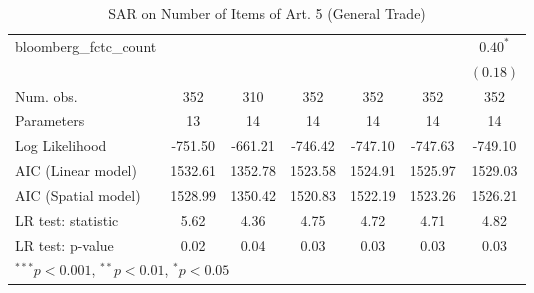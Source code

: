 \begin{table}[!h]
\begin{center}
\begin{tabular}{l c c c c c c }
bloomberg\_fctc\_count  &              &              &              &              &              & $0.40^{*}$   \\
                        &              &              &              &              &              & $(0.18)$     \\
\midrule
Num. obs.               & 352          & 310          & 352          & 352          & 352          & 352          \\
Parameters              & 13           & 14           & 14           & 14           & 14           & 14           \\
Log Likelihood          & -751.50      & -661.21      & -746.42      & -747.10      & -747.63      & -749.10      \\
AIC (Linear model)      & 1532.61      & 1352.78      & 1523.58      & 1524.91      & 1525.97      & 1529.03      \\
AIC (Spatial model)     & 1528.99      & 1350.42      & 1520.83      & 1522.19      & 1523.26      & 1526.21      \\
LR test: statistic      & 5.62         & 4.36         & 4.75         & 4.72         & 4.71         & 4.82         \\
LR test: p-value        & 0.02         & 0.04         & 0.03         & 0.03         & 0.03         & 0.03         \\
\bottomrule
\multicolumn{7}{l}{\scriptsize{$^{***}p<0.001$, $^{**}p<0.01$, $^*p<0.05$}}
\end{tabular}
\caption{SAR on Number of Items of Art. 5 (General Trade)}
\label{table:coefficients}
\end{center}
\end{table}
